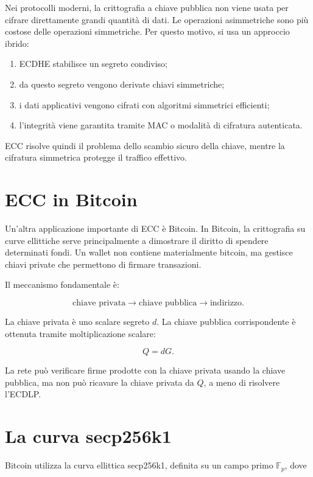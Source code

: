 \documentclass[12pt,a4paper,oneside]{report}
\begin{document}
Nei protocolli moderni, la crittografia a chiave pubblica non viene usata per cifrare direttamente grandi quantità di dati. Le operazioni asimmetriche sono più costose delle operazioni simmetriche. Per questo motivo, si usa un approccio ibrido:

\begin{enumerate}
    \item ECDHE stabilisce un segreto condiviso;
    \item da questo segreto vengono derivate chiavi simmetriche;
    \item i dati applicativi vengono cifrati con algoritmi simmetrici efficienti;
    \item l'integrità viene garantita tramite MAC o modalità di cifratura autenticata.
\end{enumerate}

ECC risolve quindi il problema dello scambio sicuro della chiave, mentre la cifratura simmetrica protegge il traffico effettivo.

\section{ECC in Bitcoin}

Un'altra applicazione importante di ECC è Bitcoin. In Bitcoin, la crittografia su curve ellittiche serve principalmente a dimostrare il diritto di spendere determinati fondi. Un wallet non contiene materialmente bitcoin, ma gestisce chiavi private che permettono di firmare transazioni.

Il meccanismo fondamentale è:

\[
\text{chiave privata}
\longrightarrow
\text{chiave pubblica}
\longrightarrow
\text{indirizzo}.
\]

La chiave privata è uno scalare segreto \(d\). La chiave pubblica corrispondente è ottenuta tramite moltiplicazione scalare:

\[
Q=dG.
\]

La rete può verificare firme prodotte con la chiave privata usando la chiave pubblica, ma non può ricavare la chiave privata da \(Q\), a meno di risolvere l'ECDLP.

\section{La curva secp256k1}

Bitcoin utilizza la curva ellittica secp256k1, definita su un campo primo \(\mathbb{F}_p\), dove
\end{document}
